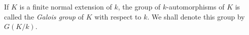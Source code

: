 If $K$ is a finite normal extension of $k$, the group of $k$-automorphisms of $K$ is called the \emph{Galois group} of $K$ with respect to $k$. We shall denote this group by $G(K/k)$.
